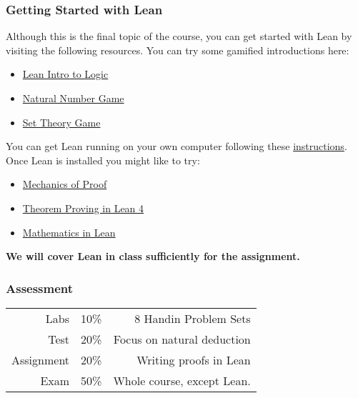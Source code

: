 \documentclass{beamer}
\begin{document}
\begin{frame}
	\frametitle{Getting Started with Lean}

	Although this is the final topic of the course, you can get started with Lean by visiting the following resources. You can try some gamified introductions here: 

	\begin{itemize}
		\item[] \href{https://adam.math.hhu.de/\#/g/trequetrum/lean4game-logic}{Lean Intro to Logic}
		\item[] \href{https://adam.math.hhu.de/\#/g/leanprover-community/nng4}{Natural Number Game}
		\item[] \href{https://adam.math.hhu.de/\#/g/djvelleman/stg4}{Set Theory Game}
	\end{itemize}

	You can get Lean running on your own computer following these \href{https://docs.lean-lang.org/lean4/doc/quickstart.html}{instructions}. Once Lean is installed you might like to try: 

	\begin{itemize}
		\item[] \href{https://hrmacbeth.github.io/math2001/00_Introduction.html\#contents-and-prerequisites}{Mechanics of Proof}
		\item[] \href{https://lean-lang.org/theorem_proving_in_lean4/dependent_type_theory.html}{Theorem Proving in Lean 4}
		\item[] \href{https://leanprover-community.github.io/mathematics_in_lean/}{Mathematics in Lean}
	\end{itemize}

	\textbf{We will cover Lean in class sufficiently for the assignment.}
\end{frame}

\begin{frame}
	\frametitle{Assessment}

	\begin{tabular}{r c r}
		Labs & 10\% & 8 Handin Problem Sets \\
		Test & 20\% & Focus on natural deduction \\
		Assignment & 20\% & Writing proofs in Lean\\
		Exam & 50\% & Whole course, except Lean.
	\end{tabular}

\end{frame}
\end{document}
